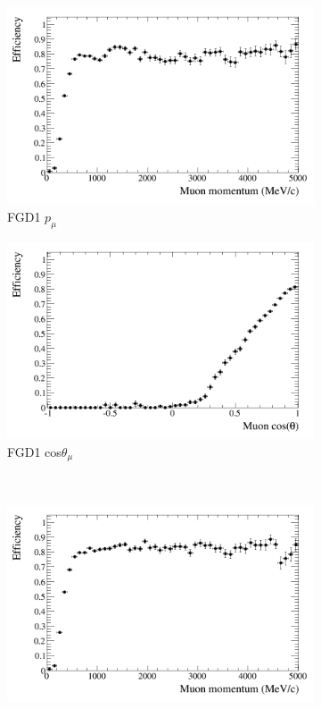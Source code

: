 \begin{figure}
\centering
\begin{subfigure}{.48\textwidth}
  \centering
  \includegraphics[width=0.95\linewidth]{figs/effmomfgd1nuinnubar}
  \caption{FGD1 $p_{\mu}$}
\end{subfigure}
\begin{subfigure}{.48\textwidth}
  \centering
  \includegraphics[width=0.95\linewidth]{figs/effcosfgd1nuinnubar}
  \caption{FGD1 cos$\theta_{\mu}$}
\end{subfigure} \\
\begin{subfigure}{.48\textwidth}
  \centering
  \includegraphics[width=0.95\linewidth]{figs/effmomfgd2nuinnubar}

\end{subfigure}
\end{figure}
